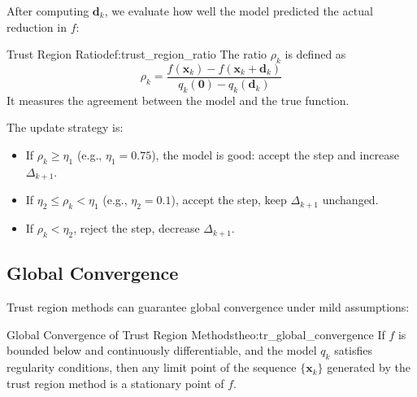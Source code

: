 \documentclass{MathNote}
\begin{document}
After computing $\bm{d}_k$, we evaluate how well the model predicted the actual reduction in $f$:

\begin{definition}{Trust Region Ratio}{def:trust_region_ratio}
    The ratio $\rho_k$ is defined as
    $$
    \rho_k = \frac{f(\bm{x}_k) - f(\bm{x}_k + \bm{d}_k)}{q_k(\bm{0}) - q_k(\bm{d}_k)}
    $$
    It measures the agreement between the model and the true function.
\end{definition}

The update strategy is:
\begin{itemize}
    \item If $\rho_k \ge \eta_1$ (e.g., $\eta_1 = 0.75$), the model is good: accept the step and increase $\Delta_{k+1}$.
    \item If $\eta_2 \le \rho_k < \eta_1$ (e.g., $\eta_2 = 0.1$), accept the step, keep $\Delta_{k+1}$ unchanged.
    \item If $\rho_k < \eta_2$, reject the step, decrease $\Delta_{k+1}$.
\end{itemize}

\subsection{Global Convergence}

Trust region methods can guarantee global convergence under mild assumptions:

\begin{theorem}{Global Convergence of Trust Region Methods}{theo:tr_global_convergence}
    If $f$ is bounded below and continuously differentiable, and the model $q_k$ satisfies regularity conditions, then any limit point of the sequence $\{\bm{x}_k\}$ generated by the trust region method is a stationary point of $f$.
\end{theorem}
\end{document}

